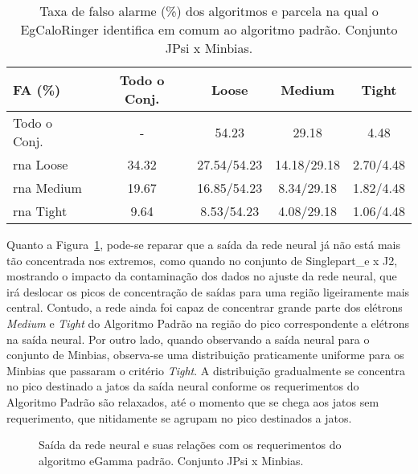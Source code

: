 \begin{table}[htb]
\centering
\begin{tabular}{l cccc}
\hline
\hline
FA (\%)& Todo o Conj. & Loose & Medium & Tight \\
\hline
Todo o Conj.    &  -    & 54.23       & 29.18       & 4.48      \\
\gls{rna} Loose & 34.32 & 27.54/54.23 & 14.18/29.18 & 2.70/4.48 \\
\gls{rna} Medium& 19.67 & 16.85/54.23 & 8.34/29.18  & 1.82/4.48 \\
\gls{rna} Tight & 9.64  & 8.53/54.23  & 4.08/29.18  & 1.06/4.48 \\
\hline
\hline
\end{tabular}
\caption{Taxa de falso alarme (\%) dos algoritmos e parcela na qual o EgCaloRinger
identifica em comum ao algoritmo padrão. Conjunto JPsi x Minbias.}
\label{tab:jpsixminb_efic_fa}
\end{table}

Quanto a Figura~\ref{fig:jpsixminb_saidaneural}, pode-se reparar que a saída da
rede neural já não está mais tão concentrada nos extremos, como quando no
conjunto de Singlepart\_e x J2, mostrando o impacto da contaminação dos dados no
ajuste da rede neural, que irá deslocar os picos de concentração de saídas para
uma região ligeiramente mais central. Contudo, a rede ainda foi capaz de
concentrar grande parte dos elétrons \emph{Medium} e \emph{Tight} do Algoritmo
Padrão na região do pico correspondente a elétrons na saída neural. Por outro
lado, quando observando a saída neural para o conjunto de Minbias, observa-se
uma distribuição praticamente uniforme para os Minbias que passaram o critério
\emph{Tight}. A distribuição gradualmente se concentra no pico destinado a jatos
da saída neural conforme os requerimentos do Algoritmo Padrão são relaxados,
até o momento que se chega aos jatos sem requerimento, que nitidamente se agrupam 
no pico destinados a jatos.

\begin{figure}[ht]
\centering
{}
\caption{Saída da rede neural e suas relações com os requerimentos do algoritmo
eGamma padrão. Conjunto JPsi x Minbias.}
\label{fig:jpsixminb_saidaneural}
\end{figure}

